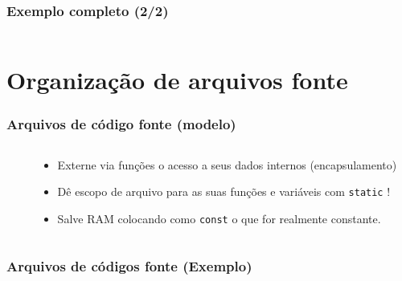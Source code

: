 \documentclass{beamer}
\begin{document}
\begin{frame}
	\frametitle{Exemplo completo (2/2)}
	\begin{columns}[T] %
		\begin{column}{.5\textwidth}
		
			\end{column}%
		\hfill%
		\begin{column}{.5\textwidth}
		
		\end{column}%
	\end{columns}
\end{frame}

\section{Organização de arquivos fonte}

\begin{frame}
	\frametitle{Arquivos de código fonte (modelo)}
	\begin{columns}[T] %
		\begin{column}{.60\textwidth}
			
		\end{column}%
		\hfill%
		\begin{column}{.40\textwidth}
			\begin{itemize}
				\item Externe via funções o acesso a seus dados internos (encapsulamento)
				\item Dê escopo de arquivo para as suas funções e variáveis com \texttt{static} !
				\item Salve RAM colocando como \texttt{const} o que for realmente constante.
			\end{itemize}
		\end{column}%
	\end{columns}
\end{frame}

\begin{frame}
	\frametitle{Arquivos de códigos fonte (Exemplo)}
	
\end{frame}

\begin{frame}[fragile]
\end{frame}

\begin{frame}[fragile]
\end{frame}

\begin{frame}[fragile]
\end{frame}
\end{document}
